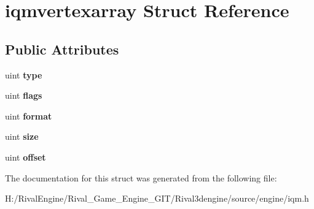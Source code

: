 \hypertarget{structiqmvertexarray}{}\section{iqmvertexarray Struct Reference}
\label{structiqmvertexarray}
\subsection*{Public Attributes}
\begin{DoxyCompactItemize}
\item 
\mbox{\label{structiqmvertexarray_ad5d3638949a91368cbc5f0df914b888c}} 
uint {\bfseries type}
\item 
\mbox{\label{structiqmvertexarray_adf0b2906e486e686b95061266fe9d736}} 
uint {\bfseries flags}
\item 
\mbox{\label{structiqmvertexarray_ac29b4008355267be35d2b80f7eb1cb59}} 
uint {\bfseries format}
\item 
\mbox{\label{structiqmvertexarray_ae6e1fd1ecd3dbf5b4b9136d3b5f07397}} 
uint {\bfseries size}
\item 
\mbox{\label{structiqmvertexarray_abf7aa8000e989263c8b27d2a51597465}} 
uint {\bfseries offset}
\end{DoxyCompactItemize}


The documentation for this struct was generated from the following file\+:\begin{DoxyCompactItemize}
\item 
H\+:/\+Rival\+Engine/\+Rival\+\_\+\+Game\+\_\+\+Engine\+\_\+\+G\+I\+T/\+Rival3dengine/source/engine/iqm.\+h\end{DoxyCompactItemize}
